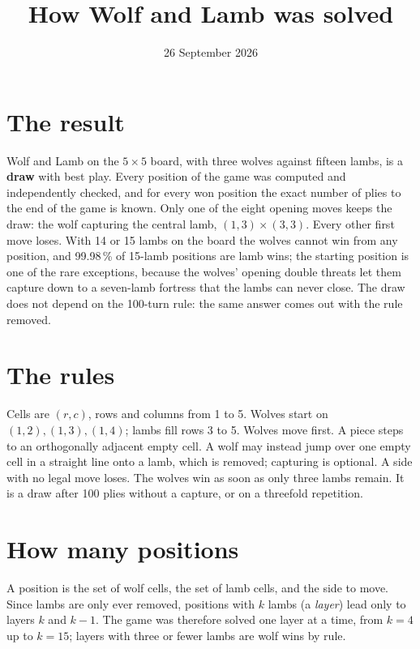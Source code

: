 \documentclass[11pt,a4paper]{article}
\title{How Wolf and Lamb was solved}
\author{}
\date{26 September 2026}
\begin{document}
\maketitle

\section*{The result}

Wolf and Lamb on the $5\times5$ board, with three wolves against fifteen lambs,
is a \textbf{draw} with best play. Every position of the game was computed and
independently checked, and for every won position the exact number of plies to
the end of the game is known. Only one of the eight opening moves keeps the draw: the
wolf capturing the central lamb, $(1,3)\times(3,3)$. Every other first move loses.
With 14 or 15 lambs on the board the wolves cannot win from any position, and
99.98\,\% of 15-lamb positions are lamb wins; the starting position is one of the
rare exceptions, because the wolves' opening double threats let them capture down
to a seven-lamb fortress that the lambs can never close. The draw does not depend
on the 100-turn rule: the same answer comes out with the rule removed.

\section*{The rules}

Cells are $(r,c)$, rows and columns from 1 to 5. Wolves start on
$(1,2),(1,3),(1,4)$; lambs fill rows 3 to 5. Wolves move first. A piece steps to an
orthogonally adjacent empty cell. A wolf may instead jump over one empty cell in a
straight line onto a lamb, which is removed; capturing is optional. A side with no
legal move loses. The wolves win as soon as only three lambs remain. It is a draw
after 100 plies without a capture, or on a threefold repetition.

\section*{How many positions}

A position is the set of wolf cells, the set of lamb cells, and the side to move.
Since lambs are only ever removed, positions with $k$ lambs (a \emph{layer}) lead
only to layers $k$ and $k-1$. The game was therefore solved one layer at a time,
from $k=4$ up to $k=15$; layers with three or fewer lambs are wolf wins by rule.
\end{document}
